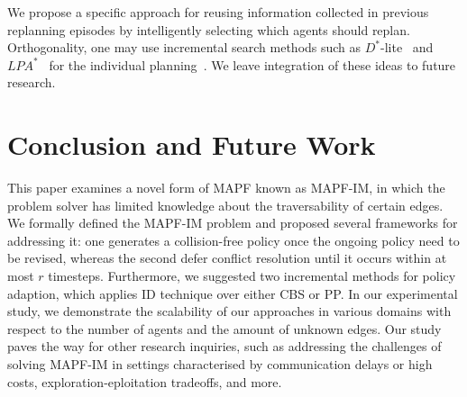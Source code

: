 \documentclass[letterpaper]{article} %
\def\
UrlFont{\rm}  %
\newcommand{\roni}[1]{\textbf{[\color{orange}RONI:#1]}}
\theoremstyle{definition}
\begin{document}

We propose a specific approach for reusing information collected in previous replanning episodes by intelligently selecting which agents should replan. Orthogonality, one may use incremental search methods such as $D^*$-lite~\cite{koenig2002d} and $LPA^*$~\cite{koenig2004lifelong} for the individual planning~\cite{boyarski2021iterative}. We leave integration of these ideas to future research.





\section{Conclusion and Future Work}

This paper examines a novel form of MAPF known as MAPF-IM, in which the problem solver has limited knowledge about the traversability of certain edges. We formally defined the MAPF-IM problem and proposed several frameworks for addressing it: one generates a collision-free policy once the ongoing policy need to be revised, whereas the second defer conflict resolution until it occurs within at most $r$ timesteps. Furthermore, we suggested two incremental methods for policy adaption, which applies ID technique over either CBS or PP. In our experimental study, we demonstrate the scalability of our approaches in various domains with respect to the number of agents and the amount of unknown edges. Our study paves the way for other research inquiries, such as addressing the challenges of solving MAPF-IM in settings characterised by communication delays or high costs, exploration-eploitation tradeoffs, and more.

\clearpage

\end{document}
